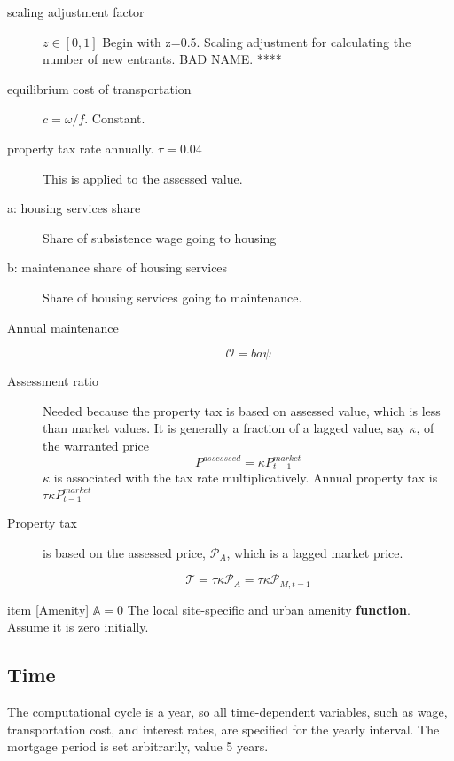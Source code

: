 \begin{description}
\item [scaling adjustment factor] $z\in[0,1]$ Begin with z=0.5. Scaling adjustment for calculating the number of new entrants. BAD NAME. ****

\item [equilibrium cost of transportation] $c = \omega/f$. Constant.
\item [property tax rate annually. $\tau=0.04$] This is applied to the assessed value.

\item[a: housing services share] Share of subsistence wage going to housing 




\item[b: maintenance share  of housing services ] Share of housing services going to maintenance.

\item [Annual maintenance]
\[\mathcal{O}=   ba\psi \]

\item[Assessment ratio] 
Needed because the property tax is based on assessed value, which is less than market values. It is generally a fraction of a lagged value, say $\kappa$,  of the warranted price
\[P^{assesssed}=  \kappa P_{t-1}^{market}\]
$\kappa$ is associated with the tax rate multiplicatively. Annual property tax is $\tau\kappa P_{t-1}^{market}$

\item [Property tax] is based on the assessed price, $\mathcal{P}_{A}$, which is a lagged market price.

\[\mathcal{T} = \tau\kappa  \mathcal{P}_{A} =  \tau\kappa \mathcal{P}_{M, t-1} \]
\end{description}


item [Amenity]
$\mathbb{A}=0$
The local site-specific and urban amenity \textbf{function}. %
 Assume it is zero initially.




\subsection{Time}
 The computational cycle is a year, so all time-dependent variables, such as wage, transportation cost, and interest rates, are specified for the yearly interval. The mortgage period is set arbitrarily, value 5 years. 



